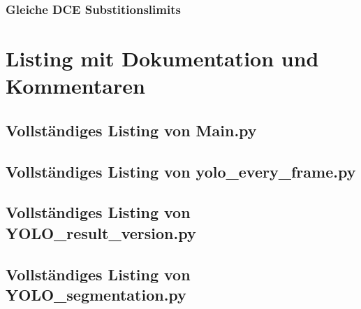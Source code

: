 {{    }
    \subsubsection{Gleiche DCE Substitionslimits}{
         
         


    }

}
\section{Listing mit Dokumentation und Kommentaren}{\label{cd:gesamt_listing}}




\subsection{Vollständiges Listing von Main.py}{
    }

\subsection{Vollständiges Listing von yolo\_every\_frame.py}{
    }

\subsection{Vollständiges Listing von YOLO\_result\_version.py}{
    }

\subsection{Vollständiges Listing von YOLO\_segmentation.py}{
    }

